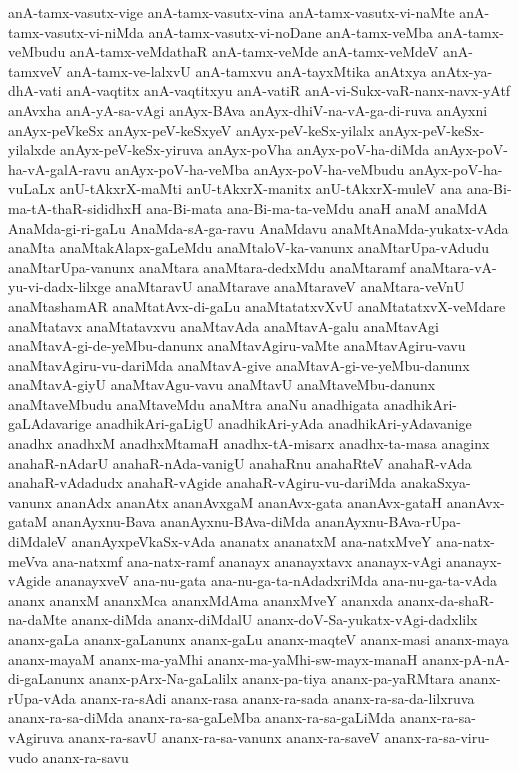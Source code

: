 {anA-tamx-vasutx-vige
anA-tamx-vasutx-vina
anA-tamx-vasutx-vi-naMte
anA-tamx-vasutx-vi-niMda
anA-tamx-vasutx-vi-noDane
anA-tamx-veMba
anA-tamx-veMbudu
anA-tamx-veMdathaR
anA-tamx-veMde
anA-tamx-veMdeV
anA-tamxveV
anA-tamx-ve-lalxvU
anA-tamxvu
anA-tayxMtika
anAtxya
anAtx-ya-dhA-vati
anA-vaqtitx
anA-vaqtitxyu
anA-vatiR
anA-vi-Sukx-vaR-nanx-navx-yAtf
anAvxha
anA-yA-sa-vAgi
anAyx-BAva
anAyx-dhiV-na-vA-ga-di-ruva
anAyxni
anAyx-peVkeSx
anAyx-peV-keSxyeV
anAyx-peV-keSx-yilalx
anAyx-peV-keSx-yilalxde
anAyx-peV-keSx-yiruva
anAyx-poVha
anAyx-poV-ha-diMda
anAyx-poV-ha-vA-galA-ravu
anAyx-poV-ha-veMba
anAyx-poV-ha-veMbudu
anAyx-poV-ha-vuLaLx
anU-tAkxrX-maMti
anU-tAkxrX-manitx
anU-tAkxrX-muleV
ana
ana-Bi-ma-tA-thaR-sididhxH
ana-Bi-mata
ana-Bi-ma-ta-veMdu
anaH
anaM
anaMdA
AnaMda-gi-ri-gaLu
AnaMda-sA-ga-ravu
AnaMdavu
anaMtAnaMda-yukatx-vAda
anaMta
anaMtakAlapx-gaLeMdu
anaMtaloV-ka-vanunx
anaMtarUpa-vAdudu
anaMtarUpa-vanunx
anaMtara
anaMtara-dedxMdu
anaMtaramf
anaMtara-vA-yu-vi-dadx-lilxge
anaMtaravU
anaMtarave
anaMtaraveV
anaMtara-veVnU
anaMtashamAR
anaMtatAvx-di-gaLu
anaMtatatxvXvU
anaMtatatxvX-veMdare
anaMtatavx
anaMtatavxvu
anaMtavAda
anaMtavA-galu
anaMtavAgi
anaMtavA-gi-de-yeMbu-danunx
anaMtavAgiru-vaMte
anaMtavAgiru-vavu
anaMtavAgiru-vu-dariMda
anaMtavA-give
anaMtavA-gi-ve-yeMbu-danunx
anaMtavA-giyU
anaMtavAgu-vavu
anaMtavU
anaMtaveMbu-danunx
anaMtaveMbudu
anaMtaveMdu
anaMtra
anaNu
anadhigata
anadhikAri-gaLAdavarige
anadhikAri-gaLigU
anadhikAri-yAda
anadhikAri-yAdavanige
anadhx
anadhxM
anadhxMtamaH
anadhx-tA-misarx
anadhx-ta-masa
anaginx
anahaR-nAdarU
anahaR-nAda-vanigU
anahaRnu
anahaRteV
anahaR-vAda
anahaR-vAdadudx
anahaR-vAgide
anahaR-vAgiru-vu-dariMda
anakaSxya-vanunx
ananAdx
ananAtx
ananAvxgaM
ananAvx-gata
ananAvx-gataH
ananAvx-gataM
ananAyxnu-Bava
ananAyxnu-BAva-diMda
ananAyxnu-BAva-rUpa-diMdaleV
ananAyxpeVkaSx-vAda
ananatx
ananatxM
ana-natxMveY
ana-natx-meVva
ana-natxmf
ana-natx-ramf
ananayx
ananayxtavx
ananayx-vAgi
ananayx-vAgide
ananayxveV
ana-nu-gata
ana-nu-ga-ta-nAdadxriMda
ana-nu-ga-ta-vAda
ananx
ananxM
ananxMca
ananxMdAma
ananxMveY
ananxda
ananx-da-shaR-na-daMte
ananx-diMda
ananx-diMdalU
ananx-doV-Sa-yukatx-vAgi-dadxlilx
ananx-gaLa
ananx-gaLanunx
ananx-gaLu
ananx-maqteV
ananx-masi
ananx-maya
ananx-mayaM
ananx-ma-yaMhi
ananx-ma-yaMhi-sw-mayx-manaH
ananx-pA-nA-di-gaLanunx
ananx-pArx-Na-gaLalilx
ananx-pa-tiya
ananx-pa-yaRMtara
ananx-rUpa-vAda
ananx-ra-sAdi
ananx-rasa
ananx-ra-sada
ananx-ra-sa-da-lilxruva
ananx-ra-sa-diMda
ananx-ra-sa-gaLeMba
ananx-ra-sa-gaLiMda
ananx-ra-sa-vAgiruva
ananx-ra-savU
ananx-ra-sa-vanunx
ananx-ra-saveV
ananx-ra-sa-viru-vudo
ananx-ra-savu
}
